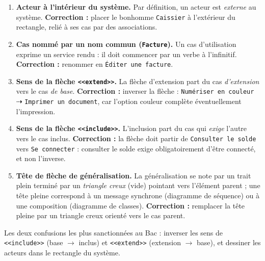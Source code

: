 \documentclass[11pt]{article}
\begin{document}
\begin{corrige}
\begin{enumerate}
\item \textbf{Acteur à l'intérieur du système.} Par définition, un acteur est \emph{externe} au système. \textbf{Correction :} placer le bonhomme \texttt{Caissier} à l'extérieur du rectangle, relié à ses cas par des associations.
\item \textbf{Cas nommé par un nom commun (\texttt{Facture}).} Un cas d'utilisation exprime un service rendu : il doit commencer par un verbe à l'infinitif. \textbf{Correction :} renommer en \texttt{Éditer une facture}.
\item \textbf{Sens de la flèche \texttt{<<extend>>}.} La flèche d'extension part du cas \emph{d'extension} vers le cas \emph{de base}. \textbf{Correction :} inverser la flèche : \texttt{Numériser en couleur} $\dashrightarrow$ \texttt{Imprimer un document}, car l'option couleur complète éventuellement l'impression.
\item \textbf{Sens de la flèche \texttt{<<include>>}.} L'inclusion part du cas qui \emph{exige} l'autre vers le cas inclus. \textbf{Correction :} la flèche doit partir de \texttt{Consulter le solde} vers \texttt{Se connecter} : consulter le solde exige obligatoirement d'être connecté, et non l'inverse.
\item \textbf{Tête de flèche de généralisation.} La généralisation se note par un trait plein terminé par un \emph{triangle creux} (vide) pointant vers l'élément parent ; une tête pleine correspond à un message synchrone (diagramme de séquence) ou à une composition (diagramme de classes). \textbf{Correction :} remplacer la tête pleine par un triangle creux orienté vers le cas parent.
\end{enumerate}
\end{corrige}

\begin{attention}
Les deux confusions les plus sanctionnées au Bac : inverser les sens de \texttt{<<include>>} (base $\to$ inclus) et \texttt{<<extend>>} (extension $\to$ base), et dessiner les acteurs dans le rectangle du système.
\end{attention}
\end{document}
